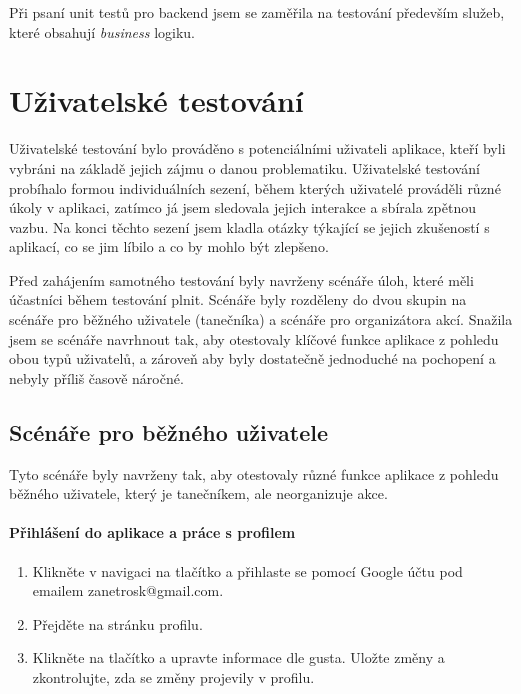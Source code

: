 Při psaní unit testů pro backend jsem se zaměřila na testování především služeb, které obsahují \textit{business} logiku. 

\section{Uživatelské testování}
Uživatelské testování bylo prováděno s potenciálními uživateli aplikace, kteří byli vybráni na základě jejich zájmu o danou problematiku. Uživatelské testování probíhalo formou individuálních sezení, během kterých uživatelé prováděli různé úkoly v aplikaci, zatímco já jsem sledovala jejich interakce a sbírala zpětnou vazbu. Na konci těchto sezení jsem kladla otázky týkající se jejich zkušeností s aplikací, co se jim líbilo a co by mohlo být zlepšeno.

Před zahájením samotného testování byly navrženy scénáře úloh, které měli účastníci během testování plnit. Scénáře byly rozděleny do dvou skupin na scénáře pro běžného uživatele (tanečníka) a scénáře pro organizátora akcí. Snažila jsem se scénáře navrhnout tak, aby otestovaly klíčové funkce aplikace z pohledu obou typů uživatelů, a zároveň aby byly dostatečně jednoduché na pochopení a nebyly příliš časově náročné.

\subsection{Scénáře pro běžného uživatele}
Tyto scénáře byly navrženy tak, aby otestovaly různé funkce aplikace z pohledu běžného uživatele, který je tanečníkem, ale neorganizuje akce. 

\paragraph*{Přihlášení do aplikace a práce s profilem}
\begin{enumerate}
    \item Klikněte v navigaci na tlačítko  a přihlaste se pomocí Google účtu pod emailem zanetrosk@gmail.com.
    \item Přejděte na stránku profilu.
    \item Klikněte na tlačítko  a upravte informace dle gusta. Uložte změny a zkontrolujte, zda se změny projevily v profilu.
\end{enumerate}

